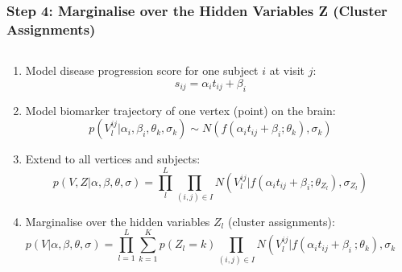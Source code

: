 \begin{frame}
\frametitle{Step 4: Marginalise over the Hidden Variables Z (Cluster Assignments)}

\begin{columns}[T]
    \begin{column}{.7\textwidth} %
   
     
   \begin{enumerate}      
      
      \item Model disease progression score for one subject $i$ at visit $j$:
      $$s_{ij} = \alpha_i t_{ij} + \beta_i$$
      
      \vspace{1em}
      
      \item Model biomarker trajectory of one vertex (point) on the brain:
      $$p(V_l^{ij} | \alpha_i, \beta_i, \theta_k, \sigma_k) \sim N(f(\alpha_i t_{ij} + \beta_i ; \theta_k), \sigma_k)$$
      
      \vspace{1em}
      
      \item Extend to all vertices and subjects:
  $$  p(V, Z | \alpha, \beta, \theta, \sigma) = \prod_l^L \prod_{(i,j) \in I} N(V_l^{ij} | f(\alpha_i t_{ij} + \beta_i ; \theta_{Z_l}), \sigma_{Z_l}) $$

      \vspace{1em}
  
      \item Marginalise over the hidden variables $Z_l$ (cluster assignments):
  \small{$$p(V|\alpha, \beta, \theta, \sigma) = \prod_{l=1}^L \sum_{k=1}^K p(Z_l = k) \prod_{(i,j) \in I} N(V_l^{ij} | f(\alpha_i t_{ij} + \beta_i \ ; \theta_k), \sigma_k)$$}
     
     \end{enumerate}
     

    \end{column}
    \begin{column}{.3\textwidth}


\end{column}
\end{columns}
\end{frame}

